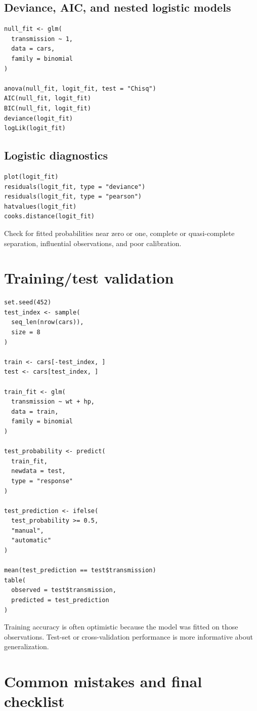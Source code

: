 \documentclass[11pt]{article}
\begin{document}
\subsection{Deviance, AIC, and nested logistic models}
\begin{lstlisting}
null_fit <- glm(
  transmission ~ 1,
  data = cars,
  family = binomial
)

anova(null_fit, logit_fit, test = "Chisq")
AIC(null_fit, logit_fit)
BIC(null_fit, logit_fit)
deviance(logit_fit)
logLik(logit_fit)
\end{lstlisting}

\subsection{Logistic diagnostics}
\begin{lstlisting}
plot(logit_fit)
residuals(logit_fit, type = "deviance")
residuals(logit_fit, type = "pearson")
hatvalues(logit_fit)
cooks.distance(logit_fit)
\end{lstlisting}

Check for fitted probabilities near zero or one, complete or quasi-complete
separation, influential observations, and poor calibration.

\section{Training/test validation}

\begin{lstlisting}
set.seed(452)
test_index <- sample(
  seq_len(nrow(cars)),
  size = 8
)

train <- cars[-test_index, ]
test <- cars[test_index, ]

train_fit <- glm(
  transmission ~ wt + hp,
  data = train,
  family = binomial
)

test_probability <- predict(
  train_fit,
  newdata = test,
  type = "response"
)

test_prediction <- ifelse(
  test_probability >= 0.5,
  "manual",
  "automatic"
)

mean(test_prediction == test$transmission)
table(
  observed = test$transmission,
  predicted = test_prediction
)
\end{lstlisting}

Training accuracy is often optimistic because the model was fitted on those
observations. Test-set or cross-validation performance is more informative
about generalization.

\section{Common mistakes and final checklist}
\end{document}

